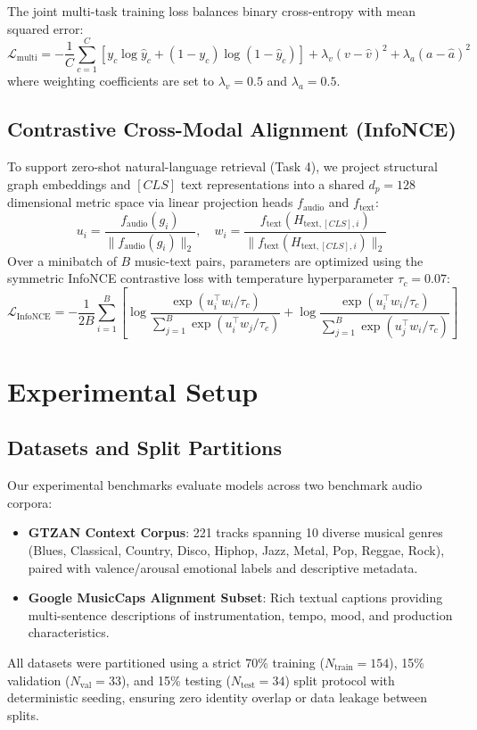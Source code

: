 \documentclass{article}
\begin{document}
The joint multi-task training loss balances binary cross-entropy with mean squared error:
\begin{equation}
\mathcal{L}_{\text{multi}} = -\frac{1}{C}\sum_{c=1}^C \left[ y_c \log \hat{y}_c + (1 - y_c)\log(1 - \hat{y}_c) \right] + \lambda_v (v - \hat{v})^2 + \lambda_a (a - \hat{a})^2
\end{equation}
where weighting coefficients are set to $\lambda_v = 0.5$ and $\lambda_a = 0.5$.

\subsection{Contrastive Cross-Modal Alignment (InfoNCE)}
To support zero-shot natural-language retrieval (Task 4), we project structural graph embeddings and $[CLS]$ text representations into a shared $d_p = 128$ dimensional metric space via linear projection heads $f_{\text{audio}}$ and $f_{\text{text}}$:
\begin{equation}
u_i = \frac{f_{\text{audio}}(g_i)}{\|f_{\text{audio}}(g_i)\|_2}, \quad w_i = \frac{f_{\text{text}}(H_{\text{text}, [CLS], i})}{\|f_{\text{text}}(H_{\text{text}, [CLS], i})\|_2}
\end{equation}
Over a minibatch of $B$ music-text pairs, parameters are optimized using the symmetric InfoNCE contrastive loss with temperature hyperparameter $\tau_c = 0.07$:
\begin{equation}
\mathcal{L}_{\text{InfoNCE}} = -\frac{1}{2B} \sum_{i=1}^B \left[ \log \frac{\exp(u_i^\top w_i / \tau_c)}{\sum_{j=1}^B \exp(u_i^\top w_j / \tau_c)} + \log \frac{\exp(u_i^\top w_i / \tau_c)}{\sum_{j=1}^B \exp(u_j^\top w_i / \tau_c)} \right]
\end{equation}

\section{Experimental Setup}
\label{sec:experiments}

\subsection{Datasets and Split Partitions}
Our experimental benchmarks evaluate models across two benchmark audio corpora:
\begin{itemize}
    \item \textbf{GTZAN Context Corpus}: 221 tracks spanning 10 diverse musical genres (Blues, Classical, Country, Disco, Hiphop, Jazz, Metal, Pop, Reggae, Rock), paired with valence/arousal emotional labels and descriptive metadata.
    \item \textbf{Google MusicCaps Alignment Subset}: Rich textual captions providing multi-sentence descriptions of instrumentation, tempo, mood, and production characteristics.
\end{itemize}
All datasets were partitioned using a strict 70\% training ($N_{\text{train}}=154$), 15\% validation ($N_{\text{val}}=33$), and 15\% testing ($N_{\text{test}}=34$) split protocol with deterministic seeding, ensuring zero identity overlap or data leakage between splits.
\end{document}
